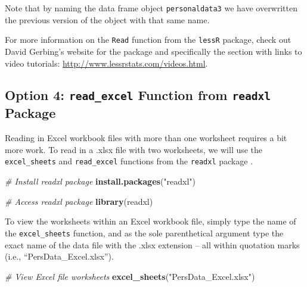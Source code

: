 \documentclass[]{book}
\newenvironment{Shaded}{\begin{snugshade}}{\end{snugshade}}
\newcommand{\KeywordTok}[1]{\textcolor[rgb]{0.13,0.29,0.53}{\textbf{#1}}}
\newcommand{\StringTok}[1]{\textcolor[rgb]{0.31,0.60,0.02}{#1}}
\newcommand{\CommentTok}[1]{\textcolor[rgb]{0.56,0.35,0.01}{\textit{#1}}}
\newcommand{\NormalTok}[1]{#1}
\begin{document}
Note that by naming the data frame object \texttt{personaldata3} we have
overwritten the previous version of the object with that same name.

For more information on the \texttt{Read} function from the
\texttt{lessR} package, check out David Gerbing's website for the
package and specifically the section with links to video tutorials:
\url{http://www.lessrstats.com/videos.html}.

\subsection{\texorpdfstring{Option 4: \texttt{read\_excel} Function from
\texttt{readxl}
Package}{Option 4: read\_excel Function from readxl Package}}\label{option-4-read_excel-function-from-readxl-package}

Reading in Excel workbook files with more than one worksheet requires a
bit more work. To read in a .xlsx file with two worksheets, we will use
the \texttt{excel\_sheets} and \texttt{read\_excel} functions from the
\texttt{readxl} package \citep{R-readxl}.

\begin{Shaded}
\begin{Highlighting}[]
\CommentTok{# Install readxl package}
\KeywordTok{install.packages}\NormalTok{(}\StringTok{"readxl"}\NormalTok{)}
\end{Highlighting}
\end{Shaded}

\begin{Shaded}
\begin{Highlighting}[]
\CommentTok{# Access readxl package}
\KeywordTok{library}\NormalTok{(readxl)}
\end{Highlighting}
\end{Shaded}

To view the worksheets within an Excel workbook file, simply type the
name of the \texttt{excel\_sheets} function, and as the sole
parenthetical argument type the exact name of the data file with the
.xlsx extension -- all within quotation marks (i.e.,
``PersData\_Excel.xlsx'').

\begin{Shaded}
\begin{Highlighting}[]
\CommentTok{# View Excel file worksheets}
\KeywordTok{excel_sheets}\NormalTok{(}\StringTok{"PersData_Excel.xlsx"}\NormalTok{)}
\end{Highlighting}
\end{Shaded}
\end{document}
